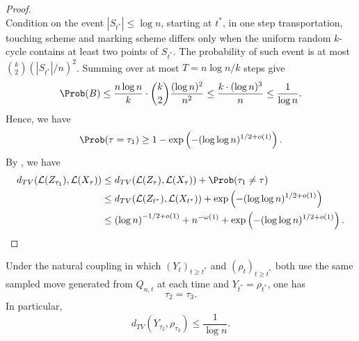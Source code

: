 \begin{proof}
\begin{equation}
    \end{equation}
     Condition on the event $|S_{t^*}|\leq \log n$, starting at $t^*$, in one step transportation, touching scheme and marking scheme differs only when the uniform random $k$-cycle contains at least two points of $S_{t^*}$. The probability of such event is at most $\binom{k}{2}(|S_{t^*}|/n)^2$. Summing over at most $T=n\log n/k$ steps give 
     \begin{equation}
         \Prob(B)\leq \frac{n\log n}{k}\cdot \binom{k}{2}\frac{(\log n)^2}{n^2}\leq \frac{k\cdot(\log n)^3}{n} \leq \frac{1}{\log n}.
     \end{equation}
     Hence, we have
     \begin{equation}
         \Prob(\tau = \tau_1) \geq 1-\exp\left(-(\log\log n)^{1/2+o(1)}\right).
     \end{equation}
By , we have 
\begin{align*}
    d_{TV}(\mathcal{L}(Z_{\tau_1}),\mathcal{L}(X_{\tau})) &\leq d_{TV}(\mathcal{L}(Z_{\tau}),\mathcal{L}(X_{\tau}))+\Prob(\tau_1 \neq \tau) \\
    &\leq d_{TV}(\mathcal{L}(Z_{t^*}),\mathcal{L}(X_{t^*})) +\exp\left(-(\log\log n)^{1/2+o(1)}\right) \\
    &\leq \left(\log n\right)^{-1/2+o(1)}+ n^{-\omega(1)} +\exp\left(-(\log\log n)^{1/2+o(1)}\right).
\end{align*}
\end{proof}

\begin{lemma}
    Under the natural coupling in which $(Y_t)_{t\ge t^*}$ and $(\rho_t)_{t\ge t^*}$ both use the same sampled move generated from $Q_{n,t}$ at each time and $Y_{t^*} = \rho_{t^*}$, one has
\[
\tau_2=\tau_3.
\] 
In particular,
    \[
    d_{TV}(Y_{\tau_2}, \rho_{\tau_3}) \leq \frac{1}{\log n}.
    \]
\end{lemma}

